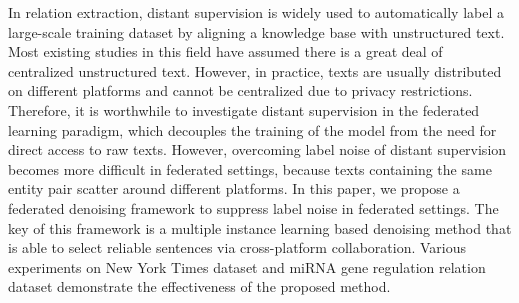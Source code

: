 In relation extraction, distant supervision is widely used to automatically label a large-scale training dataset by aligning a knowledge base with unstructured text. Most existing studies in this field have assumed there is a great deal of centralized unstructured text. However, in practice, texts  are usually distributed on different platforms and cannot be centralized due to privacy restrictions. Therefore, it is worthwhile to investigate distant supervision in the federated learning paradigm, which decouples the training of the model from the need for direct access to raw texts. However, overcoming label noise of distant supervision becomes more difficult in federated settings, because texts containing the same entity pair scatter around different platforms. In this paper, we propose a federated denoising framework to suppress label noise in federated settings. The key of this framework is a multiple instance learning based denoising method that is able to select reliable sentences via cross-platform collaboration. Various experiments on New York Times dataset and miRNA gene regulation relation dataset demonstrate the effectiveness of the proposed method.
